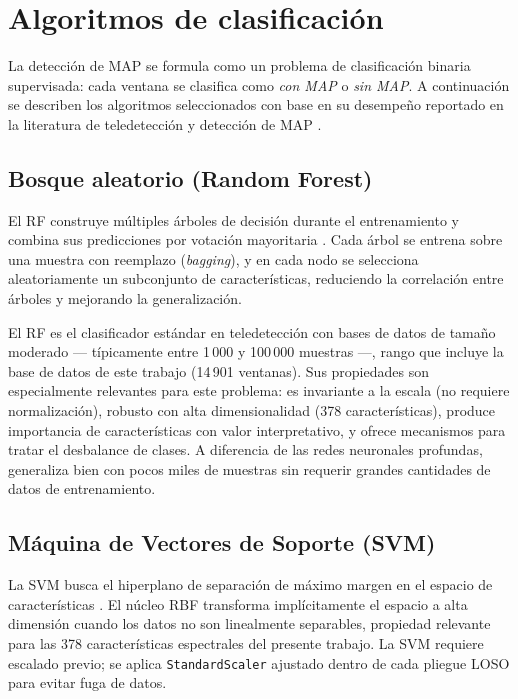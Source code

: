 \section{Algoritmos de clasificación}

La detección de \ac{MAP} se formula como un problema de clasificación
binaria supervisada: cada ventana se clasifica como \textit{con MAP} o
\textit{sin MAP}. A continuación se describen los algoritmos seleccionados
con base en su desempeño reportado en la literatura de teledetección y
detección de \ac{MAP} \cite{silva2019, barnawi2022, chen2016}.

\subsection{Bosque aleatorio (Random Forest)}

El \ac{RF} construye múltiples árboles de decisión durante el entrenamiento
y combina sus predicciones por votación mayoritaria \cite{breiman2001}.
Cada árbol se entrena sobre una muestra con reemplazo (\textit{bagging}),
y en cada nodo se selecciona aleatoriamente un subconjunto de
características, reduciendo la correlación entre árboles y mejorando la
generalización.

El \ac{RF} es el clasificador estándar en teledetección con bases de datos de
tamaño moderado \cite{silva2019} --- típicamente entre 1\,000 y 100\,000
muestras ---, rango que incluye la base de datos de este trabajo
(14\,901 ventanas). Sus propiedades son especialmente relevantes para este
problema: es invariante a la escala (no requiere normalización), robusto
con alta dimensionalidad (378 características), produce importancia de
características con valor interpretativo, y ofrece mecanismos para tratar
el desbalance de clases. A diferencia de
las redes neuronales profundas, generaliza bien con pocos miles de muestras
sin requerir grandes cantidades de datos de entrenamiento.

\subsection{Máquina de Vectores de Soporte (SVM)}

La \ac{SVM} busca el hiperplano de separación de máximo margen en el espacio
de características \cite{vapnik1995}. El núcleo RBF transforma implícitamente
el espacio a alta dimensión cuando los datos no son linealmente separables,
propiedad relevante para las 378 características espectrales del presente
trabajo. La \ac{SVM} requiere escalado previo; se aplica \texttt{StandardScaler}
ajustado dentro de cada pliegue \ac{LOSO} para evitar fuga de datos.

